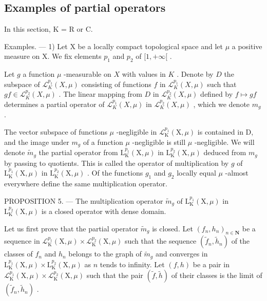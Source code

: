 \subsection{Examples of partial operators}

In this section, K = R or C.

Examples. --- 1) Let X be a locally compact topological space and let \(\mu\) a positive measure on X. We fix elements \(p_1\) and \(p_2\) of \([1, +\infty[\) .

Let \(g\) a function \(\mu\) -measurable on \(X\) with values in \(K\) . Denote by \(D\) the subspace of \(\mathcal{L}_{K}^{p_1}(X, \mu)\) consisting of functions \(f\) in \(\mathcal{L}_{K}^{p_1}(X, \mu)\) such that \(gf \in \mathcal{L}_{K}^{p_2}(X, \mu)\) . The linear mapping from \(D\) in \(\mathcal{L}_{K}^{p_2}(X, \mu)\) defined by \(f \mapsto gf\) determines a partial operator of \(\mathcal{L}_{K}^{p_1}(X, \mu)\) in \(\mathcal{L}_{K}^{p_2}(X, \mu)\) , which we denote \(m_g\) .

The vector subspace of functions \(\mu\) -negligible in \(\mathcal{L}_{\mathrm{K}}^{p_1}(\mathrm{X},\mu)\) is contained in D, and the image under \(m_g\) of a function \(\mu\) -negligible is still \(\mu\) -negligible. We will denote \(\tilde{m}_g\) the partial operator from \(\mathrm{L}_{\mathrm{K}}^{p_1}(\mathrm{X},\mu)\) in \(\mathrm{L}_{\mathrm{K}}^{p_2}(\mathrm{X},\mu)\) deduced from \(m_g\) by passing to quotients. This is called the operator of multiplication by \(g\) of \(\mathrm{L}_{\mathrm{K}}^{p_1}(\mathrm{X},\mu)\) in \(\mathrm{L}_{\mathrm{K}}^{p_2}(\mathrm{X},\mu)\) . Of the functions \(g_1\) and \(g_2\) locally equal \(\mu\) -almost everywhere define the same multiplication operator.

PROPOSITION 5. — The multiplication operator \(\widetilde{m}_{g}\) of \(\mathrm{L}_{\mathrm{K}}^{p_{1}}(\mathrm{X},\mu)\) in \(\mathrm{L}_{\mathrm{K}}^{p_{2}}(\mathrm{X},\mu)\) is a closed operator with dense domain.

Let us first prove that the partial operator \(\widetilde{m}_g\) is closed. Let \((f_n, h_n)_{n \in \mathbf{N}}\) be a sequence in \(\mathcal{L}_{\mathrm{K}}^{p_1}(\mathrm{X}, \mu) \times \mathcal{L}_{\mathrm{K}}^{p_2}(\mathrm{X}, \mu)\) such that the sequence \((\widetilde{f}_n, \widetilde{h}_n)\) of the classes of \(f_n\) and \(h_n\) belongs to the graph of \(\widetilde{m}_g\) and converges in \(\mathrm{L}_{\mathrm{K}}^{p_1}(\mathrm{X}, \mu) \times \mathrm{L}_{\mathrm{K}}^{p_2}(\mathrm{X}, \mu)\) as \(n\) tends to infinity. Let \((f, h)\) be a pair in \(\mathcal{L}_{\mathrm{K}}^{p_1}(\mathrm{X}, \mu) \times \mathcal{L}_{\mathrm{K}}^{p_2}(\mathrm{X}, \mu)\) such that the pair \((\widetilde{f}, \widetilde{h})\) of their classes is the limit of \((\widetilde{f}_n, \widetilde{h}_n)\) .

